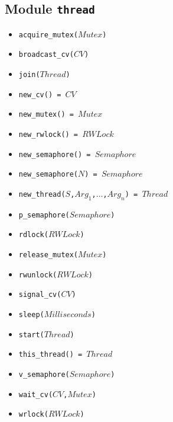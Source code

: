 \documentclass[10pt]{article}
\begin{document}
\begin{multicols}{2}
{\section*{Module \texttt{thread}}
\begin{scriptsize}
\begin{itemize}
    \item \texttt{acquire\_mutex($Mutex$)}
    \item \texttt{broadcast\_cv($CV$)}
    \item \texttt{join($Thread$)}
    \item \texttt{new\_cv() = $CV$}
    \item \texttt{new\_mutex() = $Mutex$}
    \item \texttt{new\_rwlock() = $RWLock$}
    \item \texttt{new\_semaphore() = $Semaphore$}
    \item \texttt{new\_semaphore($N$) = $Semaphore$}
    \item \texttt{new\_thread($S$,$Arg_1$,$\ldots$,$Arg_n$) = $Thread$}
    \item \texttt{p\_semaphore($Semaphore$)}
    \item \texttt{rdlock($RWLock$)}
    \item \texttt{release\_mutex($Mutex$)}
    \item \texttt{rwunlock($RWLock$)}
    \item \texttt{signal\_cv($CV$)}
    \item \texttt{sleep($Milliseconds$)}
    \item \texttt{start($Thread$)}
    \item \texttt{this\_thread() = $Thread$}
    \item \texttt{v\_semaphore($Semaphore$)}
    \item \texttt{wait\_cv($CV$,$Mutex$)}
    \item \texttt{wrlock($RWLock$)}
\end{itemize}
\end{scriptsize}

}
\end{multicols}
\end{document}
